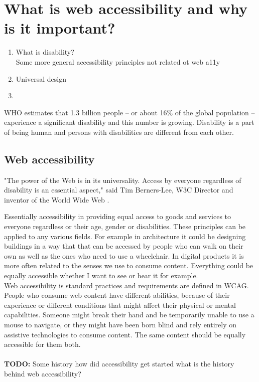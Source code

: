 \documentclass{master_thesis_section}
\begin{document}
\section{What is web accessibility and why is it important?}

\begin{enumerate}
	\item What is disability? \\
	Some more general accessibility principles not related ot web a11y
	\item Universal design
	\item
\end{enumerate}

WHO estimates that 1.3 billion people – or about 16\% of the global population – experience a significant disability and this number is growing. Disability is a part of being human and persons with disabilities are different from each other. \citep{WHODisability2022} \\


\subsection{Web accessibility}

"The power of the Web is in its universality. Access by everyone regardless of disability is an essential aspect," said Tim Berners-Lee, W3C Director and inventor of the World Wide Web \citep{worldwidewebconsortium1997}.

Essentially accessibility in providing equal access to goods and services to everyone regardless or their age, gender or disabilities. These principles can be applied to any various fields. For example in architecture it could be designing buildings in a way that that can be accessed by people who can walk on their own as well as the ones who need to use a wheelchair. In digital products it is more often related to the senses we use to consume content. Everything could be equally accessible whether I want to see or hear it for example. \\
Web accessibility is standard practices and requirements are defined in WCAG. People who consume web content have different abilities, because of their experience or different conditions that might affect their physical or mental capabilities. Someone might break their hand and be temporarily unable to use a mouse to navigate, or they might have been born blind and rely entirely on assistive technologies to consume content. The same content should be equally accessible for them both.
\\ \\ \textbf{TODO:} Some history how did accessibility get started what is the history behind web accessibility?
\end{document}
